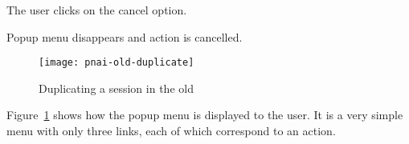 \begin{center}
\begin{usecase}
{\begin{usecasepath}[c]
        \setcounter{enumi}{4}
        \item The user clicks on the cancel option.
        \item Popup menu disappears and action is cancelled.
      \end{usecasepath}
    }
  \end{usecase}
\end{center}

\begin{figure}[htbp]
  \centering
    \texttt{[image: pnai-old-duplicate]}
  \caption{Duplicating a session in the old }
  \label{fig:pnai-old-duplicate}
\end{figure}

Figure~\ref{fig:pnai-old-duplicate} shows how the popup menu is displayed to the user.
It is a very simple menu with only three links, each of which correspond to an action.

